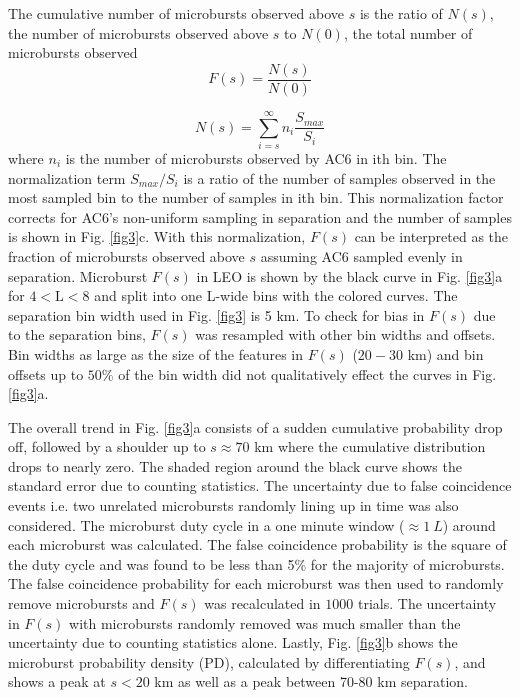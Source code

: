 \documentclass[draft]{agujournal2019}
\begin{document}
The cumulative number of microbursts observed above $s$ is the ratio of $N(s)$, the number of microbursts observed above $s$ to $N(0)$, the total number of microbursts observed 
\begin{equation}
F(s) = \frac{N(s)}{N(0)}
\end{equation} 

\begin{equation}
N(s) = \sum_{i = s}^\infty n_{i} \frac{S_{max}}{S_{i}}
\end{equation} where $n_{i}$ is the number of microbursts observed by AC6 in ith bin. The normalization term $S_{max}/S_{i}$ is a ratio of the number of samples observed in the most sampled bin to the number of samples in ith bin. This normalization factor corrects for AC6's non-uniform sampling in separation and the number of samples is shown in Fig. \ref{fig3}c. With this normalization, $F(s)$ can be interpreted as the fraction of microbursts observed above $s$ assuming AC6 sampled evenly in separation. Microburst $F(s)$ in LEO is shown by the black curve in Fig. \ref{fig3}a for $4 < \mathrm{L}< 8$ and split into one L-wide bins with the colored curves. The separation bin width used in Fig. \ref{fig3} is 5 km. To check for bias in $F(s)$ due to the separation bins, $F(s)$ was resampled with other bin widths and offsets. Bin widths as large as the size of the features in $F(s)$ ($20-30$ km) and bin offsets up to $50\%$ of the bin width did not qualitatively effect the curves in Fig. \ref{fig3}a.

The overall trend in Fig. \ref{fig3}a consists of a sudden cumulative probability drop off, followed by a shoulder up to $s \approx 70$ km where the cumulative distribution drops to nearly zero. The shaded region around the black curve shows the standard error due to counting statistics. The uncertainty due to false coincidence events i.e. two unrelated microbursts randomly lining up in time was also considered. The microburst duty cycle in a one minute window ($\approx 1 \ L$) around each microburst was calculated. The false coincidence probability is the square of the duty cycle and was found to be less than 5\% for the majority of microbursts. The false coincidence probability for each microburst was then used to randomly remove microbursts and $F(s)$ was recalculated in $1000$ trials. The uncertainty in $F(s)$ with microbursts randomly removed was much smaller than the uncertainty due to counting statistics alone. Lastly, Fig. \ref{fig3}b shows the microburst probability density (PD), calculated by differentiating $F(s)$, and shows a peak at $s < 20 $ km as well as a peak between 70-80 km separation. 
\end{document}

